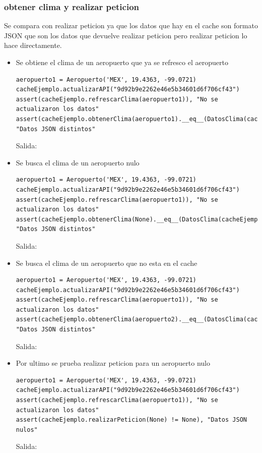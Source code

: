 \documentclass[12pt]{article}
\begin{document}
\subsubsection{obtener clima y realizar peticion}
Se compara con realizar peticion ya que los datos que hay en el cache son formato JSON que son los datos que devuelve realizar peticion pero realizar peticion lo hace directamente.
\begin{itemize}
\item Se obtiene el clima de un aeropuerto que ya se refresco el aeropuerto
\begin{verbatim}
aeropuerto1 = Aeropuerto('MEX', 19.4363, -99.0721)
cacheEjemplo.actualizarAPI("9d92b9e2262e46e5b34601d6f706cf43")
assert(cacheEjemplo.refrescarClima(aeropuerto1)), "No se actualizaron los datos"
assert(cacheEjemplo.obtenerClima(aeropuerto1).__eq__(DatosClima(cacheEjemplo.realizarPeticion(aeropuerto1)))), "Datos JSON distintos"
\end{verbatim}
  Salida:
\item Se busca el clima de un aeropuerto nulo
\begin{verbatim}
aeropuerto1 = Aeropuerto('MEX', 19.4363, -99.0721)
cacheEjemplo.actualizarAPI("9d92b9e2262e46e5b34601d6f706cf43")
assert(cacheEjemplo.refrescarClima(aeropuerto1)), "No se actualizaron los datos"
assert(cacheEjemplo.obtenerClima(None).__eq__(DatosClima(cacheEjemplo.realizarPeticion(aeropuerto1)))), "Datos JSON distintos"
\end{verbatim}
  Salida:
\item Se busca el clima de un aeropuerto que no esta en el cache
\begin{verbatim}
aeropuerto1 = Aeropuerto('MEX', 19.4363, -99.0721)
cacheEjemplo.actualizarAPI("9d92b9e2262e46e5b34601d6f706cf43")
assert(cacheEjemplo.refrescarClima(aeropuerto1)), "No se actualizaron los datos"
assert(cacheEjemplo.obtenerClima(aeropuerto2).__eq__(DatosClima(cacheEjemplo.realizarPeticion(aeropuerto1)))), "Datos JSON distintos"
\end{verbatim}
  Salida:
\item Por ultimo se prueba realizar peticion para un aeropuerto nulo
\begin{verbatim}
aeropuerto1 = Aeropuerto('MEX', 19.4363, -99.0721)
cacheEjemplo.actualizarAPI("9d92b9e2262e46e5b34601d6f706cf43")
assert(cacheEjemplo.refrescarClima(aeropuerto1)), "No se actualizaron los datos"
assert(cacheEjemplo.realizarPeticion(None) != None), "Datos JSON nulos"
\end{verbatim}
  Salida:
\end{itemize}
\end{document}
